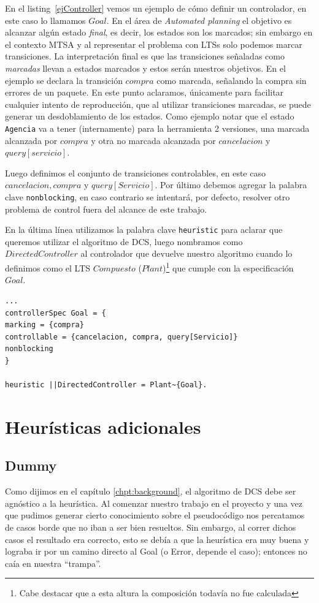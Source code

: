 En el listing~\ref{ejController} vemos un ejemplo de cómo definir un controlador, en este caso lo llamamos $Goal$. En el área de \textit{Automated planning} el objetivo es alcanzar algún estado \textit{final}, es decir, los estados son los marcados; sin embargo en el contexto MTSA y al representar el problema con LTSs solo podemos marcar transiciones. La interpretación final es que las transiciones señaladas como \textit{marcadas} llevan a estados marcados y estos serán nuestros objetivos. En el ejemplo se declara la transición $compra$ como marcada, señalando la compra sin errores de un paquete. En este punto aclaramos, únicamente para facilitar cualquier intento de reproducción, que al utilizar transiciones marcadas, se puede generar un desdoblamiento de los estados. Como ejemplo notar que el estado \texttt{Agencia} va a tener (internamente) para la herramienta 2 versiones, una marcada alcanzada por $compra$ y otra no marcada alcanzada por $cancelacion$ y $query[servicio]$.

Luego definimos el conjunto de transiciones controlables, en este caso $cancelacion, compra$ y $ query[Servicio]$. Por último debemos agregar la palabra clave \texttt{nonblocking}, en caso contrario se intentará, por defecto, resolver otro problema de control fuera del alcance de este trabajo.

En la última línea utilizamos la palabra clave \texttt{heuristic} para aclarar que queremos utilizar el algoritmo de DCS, luego nombramos como $DirectedController$ al controlador que devuelve nuestro algoritmo cuando lo definimos como el LTS $Compuesto$ ($Plant$)\footnote{Cabe destacar que a esta altura la composición todavía no fue calculada} que cumple con la especificación $Goal$.

\begin{lstlisting}[language = mtsa, caption=Ejemplo de Controller y DCS, label=ejController]
...
controllerSpec Goal = {
marking = {compra}
controllable = {cancelacion, compra, query[Servicio]}
nonblocking
}

heuristic ||DirectedController = Plant~{Goal}.
\end{lstlisting}

\section{Heurísticas adicionales}\label{chpt:heurist-nuevas}
\subsection{Dummy}
Como dijimos en el capítulo \ref{chpt:background}, el algoritmo de DCS debe ser agnóstico a la heurística. Al comenzar nuestro trabajo en el proyecto y una vez que pudimos generar cierto conocimiento sobre el pseudocódigo nos percatamos de casos borde que no iban a ser bien resueltos. Sin embargo, al correr dichos casos el resultado era correcto, esto se debía a que la heurística era muy buena y lograba ir por un camino directo al Goal (o Error, depende el caso); entonces no caía en nuestra ``trampa''.

